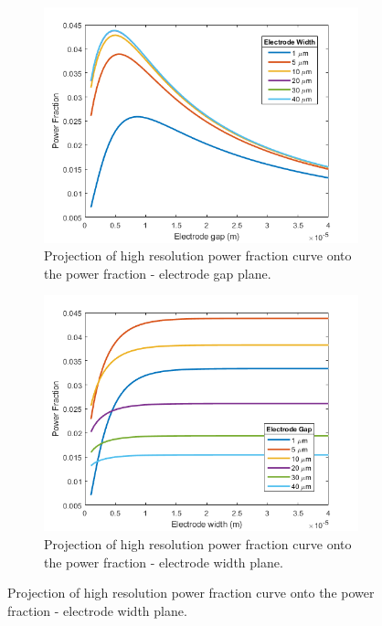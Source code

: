 \begin{figure}[h]
\begin{subfigure}[b]{0.49\textwidth}
    \end{subfigure}
    \\
    \vspace{0.1 in}
    \begin{subfigure}[b]{0.49\textwidth}
        \centering
        \includegraphics[width=\textwidth]{images/expandedPowerVsGap.png}
        \caption{Projection of high resolution power fraction curve onto the power fraction - electrode gap plane.}
    \end{subfigure}
    \hfill
    \begin{subfigure}[b]{0.49\textwidth}
        \centering
        \includegraphics[width=\textwidth]{images/expandedPowerVsWidth.png}
        \caption{Projection of high resolution power fraction curve onto the power fraction - electrode width plane.}

\end{subfigure}
\end{figure}
